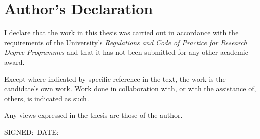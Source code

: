 
\chapter{Author's Declaration}

I declare that the work in this thesis was carried out in accordance with the
requirements of the University's \textit{Regulations and Code of Practice for
Research Degree Programmes} and that it has not been submitted for any other
academic award.

Except where indicated by specific reference in the text, the work is the
candidate's own work. Work done in collaboration with, or with the assistance
of, others, is indicated as such.

Any views expressed in the thesis are those of the author.

\vspace{2\parskip}
\makeatletter\@author\par\makeatother
\vspace{3\parskip}

SIGNED:~\makebox[55mm]{\dotfill}\hfill DATE:~\makebox[55mm]{\dotfill}


